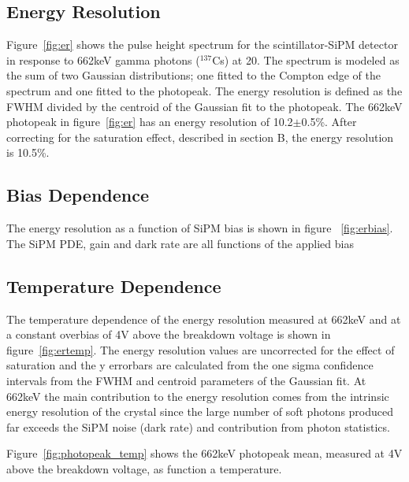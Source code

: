 \documentclass[journal]{IEEEtran}
\begin{document}
\subsection{Energy Resolution}

Figure~\ref{fig:er} shows the pulse height spectrum for the scintillator-SiPM detector in response to 662keV gamma photons ($^{137}$Cs) at 20\celsius{}. The spectrum is modeled as the sum of two Gaussian distributions; one fitted to the Compton edge of the spectrum and one fitted to the photopeak. The energy resolution is defined as the FWHM divided by the centroid of the Gaussian fit to the photopeak. The 662keV photopeak in figure~\ref{fig:er} has an energy resolution of 10.2$\pm$0.5\%. After correcting for the saturation effect, described in section B, the energy resolution is 10.5\%.  

\subsection{Bias Dependence}
The energy resolution as a function of SiPM bias is shown in figure ~\ref{fig:erbias}. The SiPM PDE, gain and dark rate are all functions of the applied bias 

\subsection{Temperature Dependence}
The temperature dependence of the energy resolution measured at 662keV and at a constant overbias of 4V above the breakdown voltage is shown in figure~\ref{fig:ertemp}. The energy resolution values are uncorrected for the effect of saturation and the y errorbars are calculated from the one sigma confidence intervals from the FWHM and centroid parameters of the Gaussian fit. At 662keV the main contribution to the energy resolution comes from the intrinsic energy resolution of the crystal since the large number of soft photons produced far exceeds the SiPM noise (dark rate) and contribution from photon statistics. 

Figure~\ref{fig:photopeak_temp} shows the 662keV photopeak mean, measured at 4V above the breakdown voltage, as function a temperature. 
\end{document}
